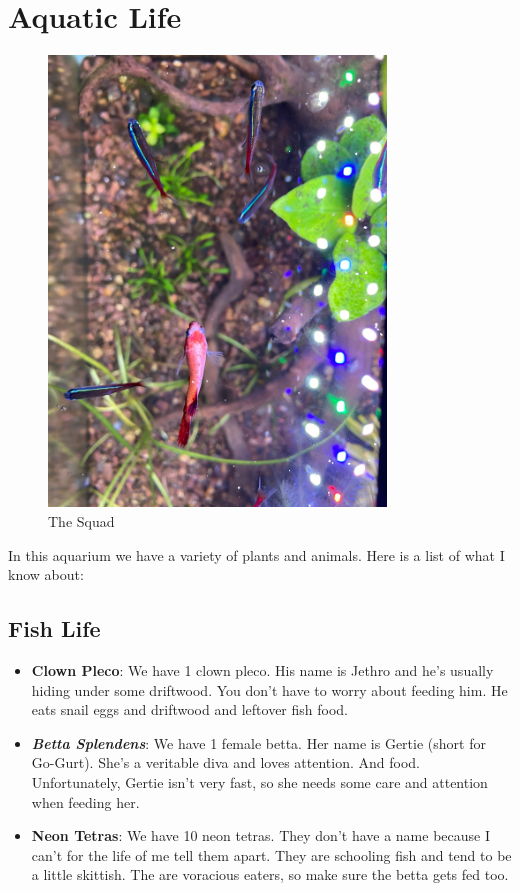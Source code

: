 \documentclass{report}
\begin{document}
\section{Aquatic Life}
\begin{figure}[H]
    \centering
    \includegraphics[width=0.8\textwidth]{GertieFocused.jpg}
    \caption{The Squad}
\end{figure}
In this aquarium we have a variety of plants and animals. Here is a list of what I know about:
\subsection{Fish Life}
\begin{itemize}
    \item \textbf{Clown Pleco}: We have 1 clown pleco. His name is Jethro and he's usually hiding under some driftwood. You 
    don't have to worry about feeding him. He eats snail eggs and driftwood and leftover fish food. 
    \item \textbf{\textit{Betta Splendens}}: We have 1 female betta. Her name is Gertie (short for Go-Gurt). She's a veritable 
    diva and loves attention. And food. Unfortunately, Gertie isn't very fast, so she needs some care and attention when 
    feeding her. 
    \item \textbf{Neon Tetras}: We have 10 neon tetras. They don't have a name because I can't for the life of me tell them apart. They are
    schooling fish and tend to be a little skittish. The are voracious eaters, so make sure the betta gets fed too.
\end{itemize}
\end{document}
